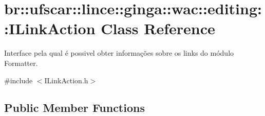 \hypertarget{classbr_1_1ufscar_1_1lince_1_1ginga_1_1wac_1_1editing_1_1ILinkAction}{
\section{br::ufscar::lince::ginga::wac::editing::ILinkAction Class Reference}
\label{classbr_1_1ufscar_1_1lince_1_1ginga_1_1wac_1_1editing_1_1ILinkAction}
}


Interface pela qual é possivel obter informações sobre os links do módulo Formatter.  




{\ttfamily \#include $<$ILinkAction.h$>$}

\subsection*{Public Member Functions}
